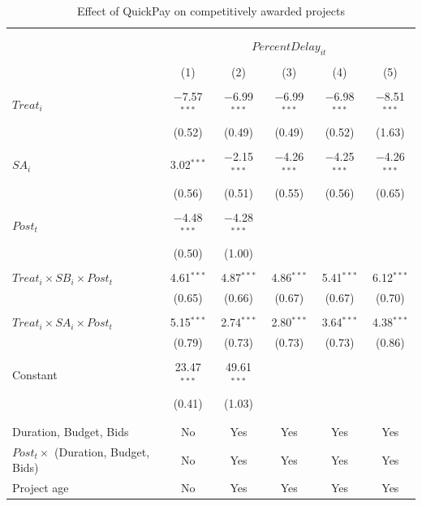 \documentclass[
]{article}
\begin{document}
\begin{table}[H] \centering 
  \caption{Effect of QuickPay on competitively awarded projects} 
  \label{} 
\small 
\begin{tabular}{@{\extracolsep{-2pt}}lccccc} 
\\[-1.8ex]\hline 
\hline \\[-1.8ex] 
\\[-1.8ex] & \multicolumn{5}{c}{$PercentDelay_{it}$  } \\ 
\\[-1.8ex] & (1) & (2) & (3) & (4) & (5)\\ 
\hline \\[-1.8ex] 
 $Treat_i$ & $-$7.57$^{***}$ & $-$6.99$^{***}$ & $-$6.99$^{***}$ & $-$6.98$^{***}$ & $-$8.51$^{***}$ \\ 
  & (0.52) & (0.49) & (0.49) & (0.52) & (1.63) \\ 
  & & & & & \\ 
 $SA_i$ & 3.02$^{***}$ & $-$2.15$^{***}$ & $-$4.26$^{***}$ & $-$4.25$^{***}$ & $-$4.26$^{***}$ \\ 
  & (0.56) & (0.51) & (0.55) & (0.56) & (0.65) \\ 
  & & & & & \\ 
 $Post_t$ & $-$4.48$^{***}$ & $-$4.28$^{***}$ &  &  &  \\ 
  & (0.50) & (1.00) &  &  &  \\ 
  & & & & & \\ 
 $Treat_i \times SB_i \times Post_t$ & 4.61$^{***}$ & 4.87$^{***}$ & 4.86$^{***}$ & 5.41$^{***}$ & 6.12$^{***}$ \\ 
  & (0.65) & (0.66) & (0.67) & (0.67) & (0.70) \\ 
  & & & & & \\ 
 $Treat_i \times SA_i \times Post_t$ & 5.15$^{***}$ & 2.74$^{***}$ & 2.80$^{***}$ & 3.64$^{***}$ & 4.38$^{***}$ \\ 
  & (0.79) & (0.73) & (0.73) & (0.73) & (0.86) \\ 
  & & & & & \\ 
 Constant & 23.47$^{***}$ & 49.61$^{***}$ &  &  &  \\ 
  & (0.41) & (1.03) &  &  &  \\ 
  & & & & & \\ 
\hline \\[-1.8ex] 
Duration, Budget, Bids & No & Yes & Yes & Yes & Yes \\ 
$Post_t \times $  (Duration, Budget, Bids) & No & Yes & Yes & Yes & Yes \\ 
Project age & No & Yes & Yes & Yes & Yes \\ 

\end{tabular}
\end{table}
\end{document}
